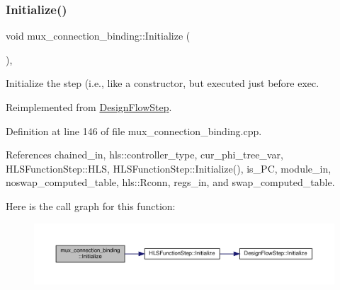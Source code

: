 \subsubsection{\texorpdfstring{Initialize()}{Initialize()}}
{\footnotesize\ttfamily void mux\+\_\+connection\+\_\+binding\+::\+Initialize (\begin{DoxyParamCaption}{ }\end{DoxyParamCaption})\hspace{0.3cm}{\ttfamily [override]}, {\ttfamily [virtual]}}



Initialize the step (i.\+e., like a constructor, but executed just before exec. 



Reimplemented from \hyperlink{classDesignFlowStep_a44b50683382a094976e1d432a7784799}{Design\+Flow\+Step}.



Definition at line 146 of file mux\+\_\+connection\+\_\+binding.\+cpp.



References chained\+\_\+in, hls\+::controller\+\_\+type, cur\+\_\+phi\+\_\+tree\+\_\+var, H\+L\+S\+Function\+Step\+::\+H\+LS, H\+L\+S\+Function\+Step\+::\+Initialize(), is\+\_\+\+PC, module\+\_\+in, noswap\+\_\+computed\+\_\+table, hls\+::\+Rconn, regs\+\_\+in, and swap\+\_\+computed\+\_\+table.

Here is the call graph for this function\+:
\nopagebreak
\begin{figure}[H]
\begin{center}
\leavevmode
\includegraphics[width=350pt]{d7/d1e/classmux__connection__binding_af8f6b0964f86f8cf2b503a0570a425e1_cgraph}
\end{center}
\end{figure}
\mbox{\label{classmux__connection__binding_a0adc59417dbca6bec2932be7341490a0}} 
